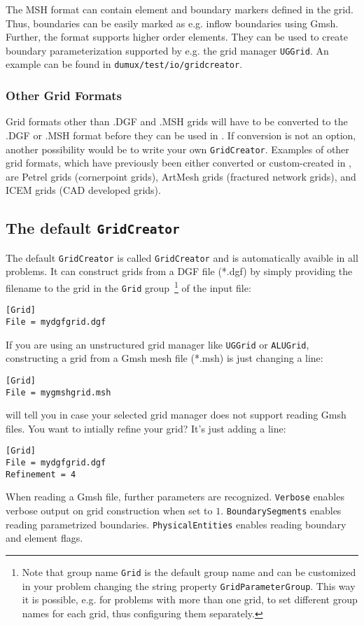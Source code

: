 The MSH format can contain element and boundary markers defined in the grid. Thus, boundaries can be easily marked as e.g. inflow boundaries
using Gmsh. Further, the format supports higher order elements. They can be used to create boundary parameterization supported by e.g. the grid
manager \texttt{UGGrid}.
An example can be found in \texttt{dumux/test\allowbreak/io/gridcreator}.

\subsubsection{Other Grid Formats}
Grid formats other than .DGF and .MSH grids will have to be converted to the .DGF or .MSH format before they can be used in \Dumux.
If conversion is not an option, another possibility would be to write your own \texttt{GridCreator}. Examples of other grid formats,
which have previously been either converted or custom-created in \Dumux, are Petrel grids (cornerpoint grids),
ArtMesh grids (fractured network grids), and ICEM grids (CAD developed grids).

\subsection{The default \texttt{GridCreator}}
The default \texttt{GridCreator} is called \texttt{GridCreator} and is automatically avaible in all problems.
It can construct grids from a DGF file (*.dgf) by simply providing the filename to the grid in the \texttt{Grid} group~\footnote{Note
that group name \texttt{Grid} is the default group name and can be customized in your problem changing the string property \texttt{GridParameterGroup}.
This way it is possible, e.g. for problems with more than one grid, to set different group names for each grid, thus configuring them separately.}
of the input file:
\begin{lstlisting}[style=DumuxParameterFile]
[Grid]
File = mydgfgrid.dgf
\end{lstlisting}
If you are using an unstructured grid manager like \texttt{UGGrid} or \texttt{ALUGrid}, constructing a grid from a Gmsh mesh file (*.msh) is just changing a line:
\begin{lstlisting}[style=DumuxParameterFile]
[Grid]
File = mygmshgrid.msh
\end{lstlisting}
\Dumux will tell you in case your selected grid manager does not support reading Gmsh files. You want to intially refine your grid? It's just adding a line:
\begin{lstlisting}[style=DumuxParameterFile]
[Grid]
File = mydgfgrid.dgf
Refinement = 4
\end{lstlisting}
When reading a Gmsh file, further parameters are recognized. \texttt{Verbose} enables verbose output on grid construction when set to $1$.
\texttt{BoundarySegments} enables reading parametrized boundaries. \texttt{PhysicalEntities} enables reading boundary and element flags.


